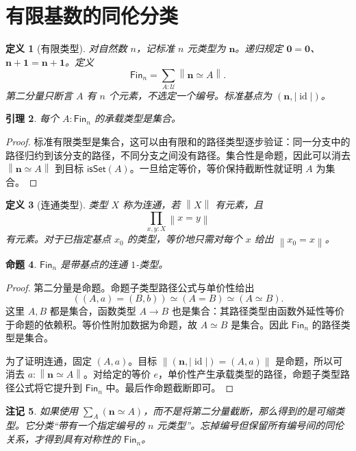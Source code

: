 \documentclass[12pt,oneside,openany,fontset=none]{ctexbook}
\theoremstyle{cn}
\newtheorem{definition}{定义}[chapter]
\newtheorem{lemma}[definition]{引理}
\newtheorem{proposition}[definition]{命题}
\newtheorem{remark}[definition]{注记}
\numberwithin{equation}{chapter}
\newcommand{\U}{\mathcal U}
\newcommand{\id}{\operatorname{id}}
\newcommand{\isSet}{\mathsf{isSet}}
\newcommand{\Fin}{\mathsf{Fin}}
\newcommand{\one}{\mathbf 1}
\newcommand{\zero}{\mathbf 0}
\newcommand{\trunc}[1]{\left\|#1\right\|}
\begin{document}
\section{有限基数的同伦分类}
\begin{definition}[有限类型]
对自然数 $n$，记标准 $n$ 元类型为 $\mathbf n$。递归规定 $\mathbf0=\zero$、$\mathbf{n+1}=\mathbf n+\one$。定义
\[
\Fin_n=\sum_{A:\U}\trunc{\mathbf n\simeq A}.
\]
第二分量只断言 $A$ 有 $n$ 个元素，不选定一个编号。标准基点为 $(\mathbf n,|\id|)$。
\end{definition}
\begin{lemma}
每个 $A:\Fin_n$ 的承载类型是集合。
\end{lemma}
\begin{proof}
标准有限类型是集合，这可以由有限和的路径类型逐步验证：同一分支中的路径归约到该分支的路径，不同分支之间没有路径。集合性是命题，因此可以消去 $\trunc{\mathbf n\simeq A}$ 到目标 $\isSet(A)$。一旦给定等价，等价保持截断性就证明 $A$ 为集合。
\end{proof}
\begin{definition}[连通类型]
类型 $X$ 称为连通，若 $\trunc X$ 有元素，且
\[
\prod_{x,y:X}\trunc{x=y}
\]
有元素。对于已指定基点 $x_0$ 的类型，等价地只需对每个 $x$ 给出 $\trunc{x_0=x}$。
\end{definition}
\begin{proposition}
$\Fin_n$ 是带基点的连通 $1$-类型。
\end{proposition}
\begin{proof}
第二分量是命题。命题子类型路径公式与单价性给出
\[
((A,a)=(B,b))\simeq(A=B)\simeq(A\simeq B).
\]
这里 $A,B$ 都是集合，函数类型 $A\to B$ 也是集合：其路径类型由函数外延性等价于命题的依赖积。等价性附加数据为命题，故 $A\simeq B$ 是集合。因此 $\Fin_n$ 的路径类型是集合。

为了证明连通，固定 $(A,a)$。目标 $\trunc{(\mathbf n,|\id|)=(A,a)}$ 是命题，所以可消去 $a:\trunc{\mathbf n\simeq A}$。对给定的等价 $e$，单价性产生承载类型的路径，命题子类型路径公式将它提升到 $\Fin_n$ 中。最后作命题截断即可。
\end{proof}
\begin{remark}
如果使用 $\sum_A(\mathbf n\simeq A)$，而不是将第二分量截断，那么得到的是可缩类型。它分类“带有一个指定编号的 $n$ 元类型”。忘掉编号但保留所有编号间的同伦关系，才得到具有对称性的 $\Fin_n$。
\end{remark}
\end{document}
